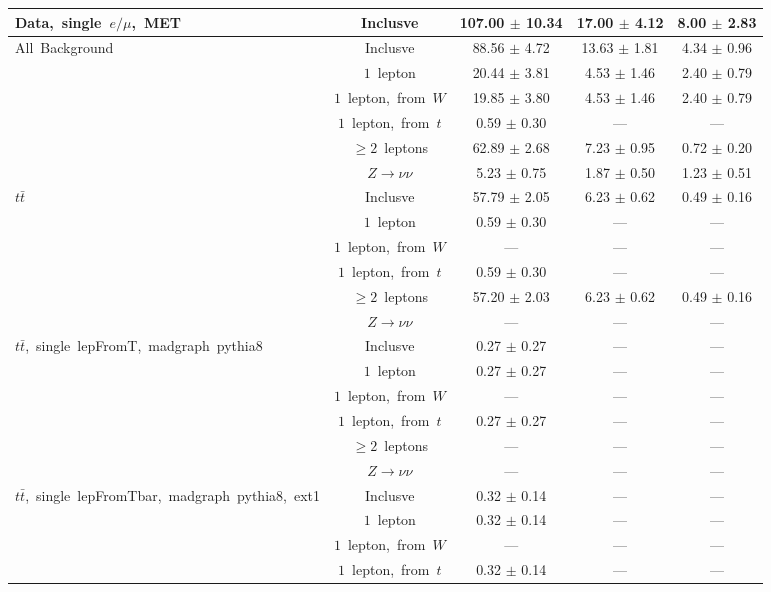 \documentclass{article}
\begin{document}
\begin{longtable}{|l|c|c|c|c|}
\multirow{1}{*}{Data,~single~$e/\mu$,~MET} & Inclusve  & 107.00 $\pm$ 10.34  & 17.00 $\pm$ 4.12  & 8.00 $\pm$ 2.83 \\* 
\hline \hline 
\multirow{6}{*}{All~Background} & Inclusve  & 88.56 $\pm$ 4.72  & 13.63 $\pm$ 1.81  & 4.34 $\pm$ 0.96 \\* 
 & $1$~lepton  & 20.44 $\pm$ 3.81  & 4.53 $\pm$ 1.46  & 2.40 $\pm$ 0.79 \\* 
 & $1$~lepton,~from~$W$  & 19.85 $\pm$ 3.80  & 4.53 $\pm$ 1.46  & 2.40 $\pm$ 0.79 \\* 
 & $1$~lepton,~from~$t$  & 0.59 $\pm$ 0.30  & ---  & --- \\* 
 & $\ge2$~leptons  & 62.89 $\pm$ 2.68  & 7.23 $\pm$ 0.95  & 0.72 $\pm$ 0.20 \\* 
 & $Z\rightarrow\nu\nu$  & 5.23 $\pm$ 0.75  & 1.87 $\pm$ 0.50  & 1.23 $\pm$ 0.51 \\* 
\hline 
\multirow{6}{*}{$t\bar{t}$} & Inclusve  & 57.79 $\pm$ 2.05  & 6.23 $\pm$ 0.62  & 0.49 $\pm$ 0.16 \\* 
 & $1$~lepton  & 0.59 $\pm$ 0.30  & ---  & --- \\* 
 & $1$~lepton,~from~$W$  & ---  & ---  & --- \\* 
 & $1$~lepton,~from~$t$  & 0.59 $\pm$ 0.30  & ---  & --- \\* 
 & $\ge2$~leptons  & 57.20 $\pm$ 2.03  & 6.23 $\pm$ 0.62  & 0.49 $\pm$ 0.16 \\* 
 & $Z\rightarrow\nu\nu$  & ---  & ---  & --- \\* 
\hline 
\multirow{6}{*}{$t\bar{t}$,~single~lepFromT,~madgraph~pythia8} & Inclusve  & 0.27 $\pm$ 0.27  & ---  & --- \\* 
 & $1$~lepton  & 0.27 $\pm$ 0.27  & ---  & --- \\* 
 & $1$~lepton,~from~$W$  & ---  & ---  & --- \\* 
 & $1$~lepton,~from~$t$  & 0.27 $\pm$ 0.27  & ---  & --- \\* 
 & $\ge2$~leptons  & ---  & ---  & --- \\* 
 & $Z\rightarrow\nu\nu$  & ---  & ---  & --- \\* 
\hline 
\multirow{6}{*}{$t\bar{t}$,~single~lepFromTbar,~madgraph~pythia8,~ext1} & Inclusve  & 0.32 $\pm$ 0.14  & ---  & --- \\* 
 & $1$~lepton  & 0.32 $\pm$ 0.14  & ---  & --- \\* 
 & $1$~lepton,~from~$W$  & ---  & ---  & --- \\* 
 & $1$~lepton,~from~$t$  & 0.32 $\pm$ 0.14  & ---  & --- \\* 

\end{longtable}
\end{document}
